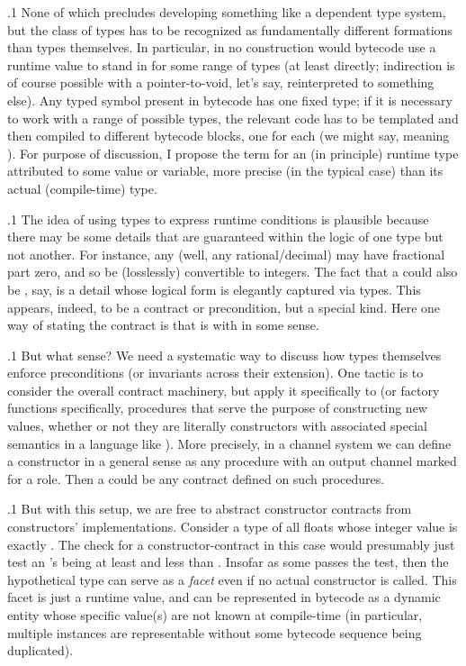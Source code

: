\documentclass[11pt, twocolumn]{article}
\begin{document}
\p.1{%
None of which precludes developing something
like a dependent type system, but the
class of  types has to be
recognized as fundamentally different
formations than types themselves. In particular,
in no construction would bytecode
use a runtime value to stand in for
some range of types (at least directly;
indirection is of course possible
with a pointer-to-void, let's say,
reinterpreted to something else). Any
typed symbol present in bytecode
has one fixed type; if it is necessary
to work with a range of possible types,
the relevant code has to be templated and
then compiled to different bytecode
blocks, one for each  (we
might say, meaning ). For purpose of discussion,
I propose the term 
for an (in principle) runtime type
attributed to some value or variable,
more precise (in the typical case)
than its actual (compile-time) type.
}%

\p.1{%
The idea of using types to express
runtime conditions is plausible because
there may be some details that are guaranteed
within the logic of one type but not another.
For instance, any  (well, any rational/decimal) may
have fractional part zero, and so
be (losslessly) convertible to integers.
The fact that a   could also
be , say, is a detail whose logical
form is elegantly captured via types.
This appears, indeed, to be a contract
or precondition, but a special kind.
Here one way of stating the contract
is that  is  with
 in some sense.
}%

\p.1{%
But what sense? We need a systematic
way to discuss how types themselves enforce
preconditions (or invariants across their extension).
One tactic is to consider the overall contract
machinery, but apply it specifically
to  (or factory functions \mdash{} specifically,
procedures that serve the purpose of constructing
new values, whether or not they are literally
constructors with associated special semantics
in a language like ). More precisely,
in a channel system we can define a constructor in
a general sense as any procedure with an output
channel marked for a  role. Then a
 could be any contract
defined on such procedures.
}%

\p.1{%
But with this setup, we are free to abstract constructor
contracts from constructors' implementations.
Consider a type of all floats whose integer
value is exactly . The check for a
constructor-contract in this case would
presumably just test an 's being at
least  and less than .
Insofar as some  passes the test,
then the hypothetical type can serve as a
\textit{facet} even if no actual constructor
is called. This facet is just a runtime
value, and can be represented in bytecode
as a dynamic entity whose specific value(s)
are not known at compile-time (in particular,
multiple instances are representable
without some bytecode sequence being duplicated).
}%
\end{document}
